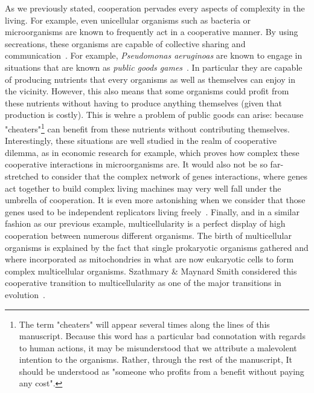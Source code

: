     As we previously stated, cooperation pervades every aspects of complexity in the living. For example, even unicellular organisms such as bacteria or microorganisms are known to frequently act in a cooperative manner. By using secreations, these organisms are capable of collective sharing and communication~\parencite{Elena2003, Keller2006, West2006}. For example, \emph{Pseudomonas aeruginoas} are known to engage in situations that are known as \emph{public goods games}~\parencite{Popat2012, Harrison2013}. In particular they are capable of producing nutrients that every organisms as well as themselves can enjoy in the vicinity. However, this also means that some organisms could profit from these nutrients without having to produce anything themselves (given that production is costly). This is wehre a problem of public goods can arise: because "cheaters"\footnote{The term "cheaters" will appear several times along the lines of this manuscript. Because this word has a particular bad connotation with regards to human actions, it may be misunderstood that we attribute a malevolent intention to the organisms. Rather, through the rest of the manuscript, It should be understood as "someone who profits from a benefit without paying any cost".} can benefit from these nutrients without contributing themselves. Interestingly, these situations are well studied in the realm of cooperative dilemma, as in economic research for example, which proves how complex these cooperative interactions in microorganisms are. It would also not be so far-stretched to consider that the complex network of genes interactions, where genes act together to build complex living machines may very well fall under the umbrella of cooperation. It is even more astonishing when we consider that those genes used to be independent replicators living freely~\parencite{Dawkins1976, Szathmary1995}. Finally, and in a similar fashion as our previous example, multicellularity is a perfect display of high cooperation between numerous different organisms. The birth of multicellular organisms is explained by the fact that single prokaryotic organisms gathered and where incorporated as mitochondries in what are now eukaryotic cells to form complex multicellular organisms. Szathmary \& Maynard Smith considered this cooperative transition to multicellularity as one of the major transitions in evolution~\parencite{Szathmary1995}.

